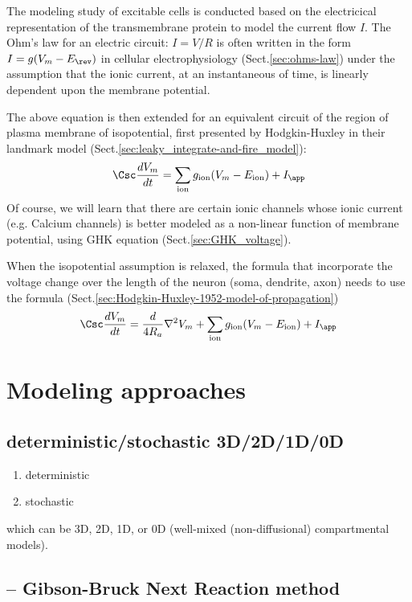 The modeling study of excitable cells is conducted based on the electricical
representation of the transmembrane protein to model the current flow $I$.
The Ohm's law for an electric circuit: $I=V/R$ is often written in the form
$I=g(V_m-E_\rev)$ in cellular electrophysiology (Sect.\ref{sec:ohms-law}) under
the assumption that the ionic current, at an instantaneous of time, is linearly
dependent upon the membrane potential. 

The above equation is then extended for an equivalent circuit of the region of
plasma membrane of isopotential, first presented by Hodgkin-Huxley in their
landmark model (Sect.\ref{sec:leaky_integrate-and-fire_model}):
\begin{equation}
\Csc \frac{dV_m}{dt} = \sum_\ion g_\ion (V_m - E_\ion) + I_\app
\end{equation}
Of course, we will learn that there are certain ionic channels whose ionic
current (e.g. Calcium channels) is better modeled as a non-linear function of
membrane potential, using GHK equation (Sect.\ref{sec:GHK_voltage}).

When the isopotential assumption is relaxed, the formula that incorporate the
voltage change over the length of the neuron (soma, dendrite, axon) needs to use
the formula (Sect.\ref{sec:Hodgkin-Huxley-1952-model-of-propagation})
\begin{equation}
\Csc \frac{dV_m}{dt} = \frac{d}{4R_a}\nabla^2 V_m + \sum_\ion g_\ion (V_m - E_\ion) + I_\app
\end{equation}

\section{Modeling approaches}

\subsection{deterministic/stochastic 3D/2D/1D/0D}

\begin{enumerate}
  \item deterministic
  
  \item stochastic
\end{enumerate}
which can be 3D, 2D, 1D, or 0D (well-mixed (non-diffusional) compartmental
models).

\subsection{-- Gibson-Bruck Next Reaction method}
\label{sec:Gibson-Bruck-Next-Reaction-method}

